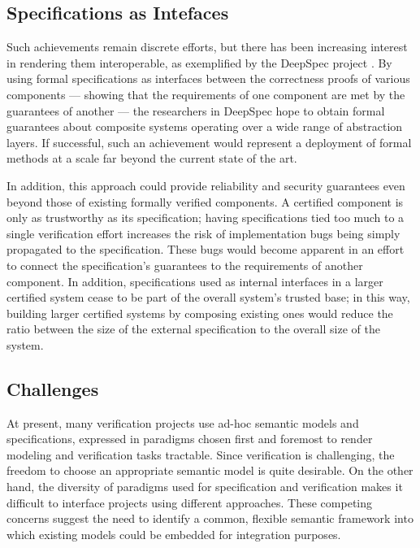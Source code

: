 \documentclass[acmsmall,timestamp,review]{acmart}
\begin{document}

\subsection{Specifications as Intefaces} %

Such achievements remain discrete efforts, but
there has been increasing interest in rendering them interoperable,
as exemplified by the DeepSpec project \cite{deepspec}.
By using formal specifications as interfaces
between the correctness proofs of various components ---
showing that the requirements of one component
are met by the guarantees of another ---
the researchers in DeepSpec hope to
obtain formal guarantees about composite systems
operating over a wide range of abstraction layers.
If successful,
such an achievement would represent a deployment of formal methods
at a scale far beyond the current state of the art.

In addition,
this approach could provide reliability and security guarantees
even beyond those of existing formally verified components.
A certified component is only as trustworthy as its specification;
having specifications tied too much to a single verification effort
increases the risk of
implementation bugs being simply propagated to
the specification.
These bugs would become apparent in an effort to
connect the specification's guarantees to
the requirements of another component.
In addition,
specifications used as internal interfaces
in a larger certified system cease to be part of
the overall system's trusted base;
in this way,
building larger certified systems
by composing existing ones
would reduce the
ratio between the size of the external specification to
the overall size of the system.


\subsection{Challenges} %

At present, many verification projects
use ad-hoc semantic models and specifications,
expressed in paradigms chosen first and foremost
to render modeling and verification tasks tractable.
Since verification is challenging,
the freedom to choose an appropriate semantic model
is quite desirable.
On the other hand,
the diversity of paradigms used for specification and verification
makes it difficult
to interface projects using different approaches.
These competing concerns
suggest the need to identify a common,
flexible semantic framework
into which existing models could be embedded
for integration purposes.
\end{document}
